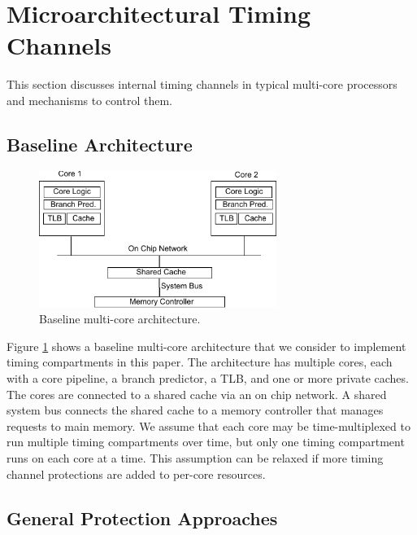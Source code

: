 \section{Microarchitectural Timing Channels}

This section discusses internal timing channels in typical
multi-core processors and mechanisms to control them.

\subsection{Baseline Architecture}

    \begin{figure}
        \begin{center}
            \includegraphics[width=3.04in]{figs/baseline.pdf}
            \caption{Baseline multi-core architecture.}
            \label{fig:baseline}
        \end{center}
    \end{figure}

Figure \ref{fig:baseline} shows a baseline multi-core architecture that we
consider to implement timing compartments in this paper. The architecture
has multiple cores, each with a core pipeline, a branch predictor, a TLB,
and one or more private caches. 
The cores are connected to a shared cache via an on chip network. A shared system 
bus connects the shared cache to a memory controller that manages requests to 
main memory.
We assume that each core may be time-multiplexed to run multiple timing
compartments over time, but only one timing compartment runs on each core
at a time. This assumption can be relaxed if more timing channel protections
are added to per-core resources.


\subsection{General Protection Approaches}

